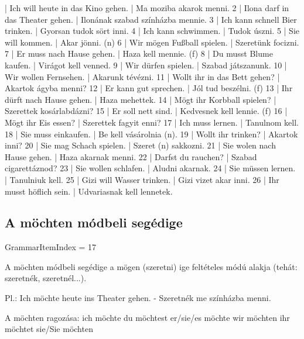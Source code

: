 \documentclass{article}
\newenvironment{desc}{\verbatim}{\endverbatim}
\newenvironment{exmp}{\verbatim}{\endverbatim}
\begin{document}
\begin{exmp}
1 | Ich will heute in das Kino gehen. | Ma moziba akarok menni.
2 | Ilona darf in das Theater gehen. | Ilonának szabad színházba mennie.
3 | Ich kann schnell Bier trinken. | Gyorsan tudok sört inni.
4 | Ich kann schwimmen. | Tudok úszni.
5 | Sie will kommen. | Akar jönni. (n)
6 | Wir mögen Fußball spielen. | Szeretünk focizni.
7 | Er muss nach Hause gehen. | Haza kell mennie. (f)
8 | Du musst Blume kaufen. | Virágot kell venned.
9 | Wir dürfen spielen. | Szabad játszanunk.
10 | Wir wollen Fernsehen. | Akarunk tévézni.
11 | Wollt ihr in das Bett gehen? | Akartok ágyba menni?
12 | Er kann gut sprechen. | Jól tud beszélni. (f)
13 | Ihr dürft nach Hause gehen. | Haza mehettek.
14 | Mögt ihr Korbball spielen? | Szerettek kosárlabdázni?
15 | Er soll nett sind. | Kedvesnek kell lennie. (f)
16 | Mögt ihr Eis essen? | Szerettek fagyit enni?
17 | Ich muss lernen. | Tanulnom kell.
18 | Sie muss einkaufen. | Be kell vásárolnia (n).
19 | Wollt ihr trinken? | Akartok inni?
20 | Sie mag Schach spielen. | Szeret (n) sakkozni.
21 | Sie wolen nach Hause gehen. | Haza akarnak menni.
22 | Darfst du rauchen? | Szabad cigarettáznod?
23 | Sie wollen schlafen. | Aludni akarnak.
24 | Sie müssen lernen. | Tanulniuk kell.
25 | Gizi will Wasser trinken. | Gizi vizet akar inni.
26 | Ihr musst höflich sein. | Udvariasnak kell lennetek.
\end{exmp}

\subsection{A möchten módbeli segédige}

GrammarItemIndex = 17

\begin{desc}
A möchten módbeli segédige a mögen (szeretni) ige feltételes módú
alakja (tehát: szeretnék, szeretnél...).

Pl.: Ich möchte heute ins Theater gehen. - Szeretnék me színházba menni.

A möchten ragozása:
ich möchte 
du möchtest 
er/sie/es möchte 
wir möchten 
ihr möchtet 
sie/Sie möchten
\end{desc}
\end{document}
